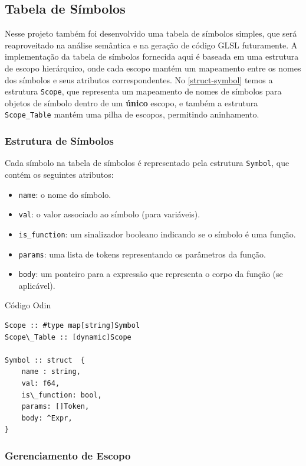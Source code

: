 \documentclass[english, 
               brazil, 
               bsc] %
               {dcomp-abntex2}
\begin{document}
\subsection{Tabela de Símbolos}

Nesse projeto também foi desenvolvido uma tabela de símbolos simples, que será reaproveitado na análise semântica e na geração de código GLSL futuramente. A implementação da tabela de símbolos fornecida aqui é baseada em uma estrutura de escopo hierárquico, onde cada escopo mantém um mapeamento entre os nomes dos símbolos e seus atributos correspondentes. No \autoref{struct-symbol} temos a estrutura \texttt{Scope}, que representa um mapeamento de nomes de símbolos para objetos de símbolo dentro de um \textbf{único} escopo, e também a estrutura \texttt{Scope\_Table} mantém uma pilha de escopos, permitindo aninhamento.

\subsubsection{Estrutura de Símbolos}

Cada símbolo na tabela de símbolos é representado pela estrutura \texttt{Symbol}, que contém os seguintes atributos:
\begin{itemize}
    \item \texttt{name}: o nome do símbolo.
    \item \texttt{val}: o valor associado ao símbolo (para variáveis).
    \item \texttt{is\_function}: um sinalizador booleano indicando se o símbolo é uma função.
    \item \texttt{params}: uma lista de tokens representando os parâmetros da função.
    \item \texttt{body}: um ponteiro para a expressão que representa o corpo da função (se aplicável).
\end{itemize}


\begin{codigo}[htb]
\caption{Código Odin}
\label{struct-symbol}
\begin{lstlisting}
Scope :: #type map[string]Symbol
Scope\_Table :: [dynamic]Scope

Symbol :: struct  {
    name : string,
    val: f64,
    is\_function: bool,
    params: []Token,
    body: ^Expr,
}

\end{lstlisting}
\end{codigo}

\subsubsection{Gerenciamento de Escopo}
\end{document}
